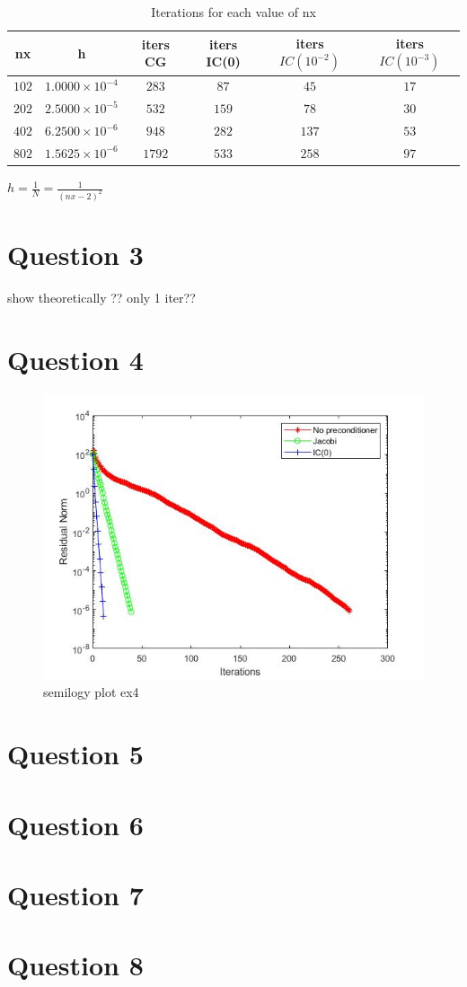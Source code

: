 \documentclass[a4paper, 11pt]{article}
\begin{document}
		\begin{table}[H]
			\centering
			\begin{tabular}{c|c|c|c|c|c}
				\textbf{nx} & \textbf{h} & \textbf{iters CG} & \textbf{iters IC(0)} & \textbf{iters $IC(10^{-2})$} & \textbf{iters $IC(10^{-3})$} \\ \hline
				$ 102 $ & $ 1.0000 \times 10^{-4} $ 	& $ 283 $ & $ 87 $ & $ 45 $ & $ 17 $ \\ \hline
				$ 202 $ & $ 2.5000 \times 10^{-5} $ 	& $ 532 $ & $ 159 $ & $ 78 $ & $ 30 $ \\ \hline
				$ 402 $ & $ 6.2500 \times 10^{-6} $  	& $ 948 $ & $ 282 $ & $ 137 $ & $ 53 $\\ \hline
				$ 802 $ & $ 1.5625 \times 10^{-6} $ 	& $ 1792 $& $ 533 $ & $ 258 $ & $ 97 $ \\ \hline
			\end{tabular}
			\caption{Iterations for each value of nx}
			\label{table:ex2-1}
		\end{table}	
		
		$ h = \frac{1}{N} = \frac{1}{(nx-2)^2} $
		
		
		
		\section*{Question 3}
		show theoretically ??
		only 1 iter??
		
		
		\section*{Question 4}		
		\begin{figure}[H]
			\centering
			\includegraphics[width=.6\linewidth]{ex4.jpg}
			\caption{semilogy plot ex4}
			\label{fig:ex4}
		\end{figure}
		
		
		\section*{Question 5}
		
		
		\section*{Question 6}
		
		
		\section*{Question 7}
		
		
		\section*{Question 8}
	
	
	
\end{document}
